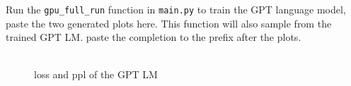 \noindent\todo{} Run the \texttt{gpu\_full\_run} function in \texttt{main.py} to train the GPT language model, paste the two generated plots here. This function will also sample from the trained GPT LM. paste the completion to the prefix after the plots.\\
\noindent {\color{red}{your plots}}\\
\begin{figure}[h]
    \centering
    \hfill
    \caption{loss and ppl of the GPT LM}
\end{figure}
